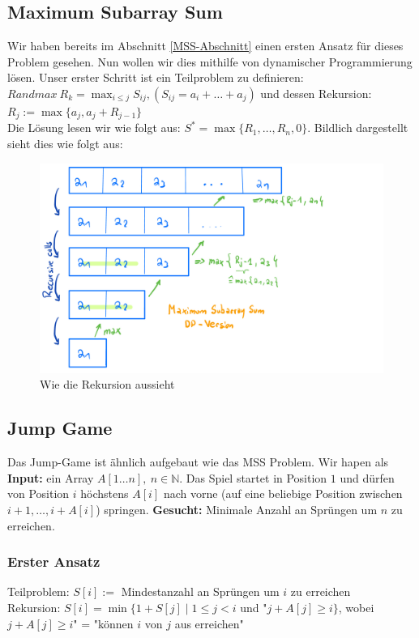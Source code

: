 \documentclass[a4paper]{article}
\begin{document}
\subsection{Maximum Subarray Sum }
Wir haben bereits im Abschnitt \ref{MSS-Abschnitt} einen ersten Ansatz für dieses Problem gesehen. Nun wollen wir dies mithilfe von dynamischer Programmierung lösen.
Unser erster Schritt ist ein Teilproblem zu definieren: \\
$Randmax \ R_k = \max_{i\leq j} S_{ij}, (S_{ij} = a_i + \dots + a_j)$ und dessen Rekursion: $R_j := \max\lbrace a_j,a_j+R_{j-1}\rbrace$ \\
Die Lösung lesen wir wie folgt aus: $S^* = \max\lbrace R_1, \dots, R_n, 0 \rbrace$. Bildlich dargestellt sieht dies wie folgt aus:
\begin{figure}
    \centering
    \includegraphics[width = \textwidth]{Pictures/MSS-DPVersion.jpeg}
    \caption{Wie die Rekursion aussieht}
    \label{fig:MSS-DP}
\end{figure}

\subsection{Jump Game}
Das Jump-Game ist ähnlich aufgebaut wie das MSS Problem. Wir hapen als \textbf{Input:} ein Array $A[1\dots n], \ n \in \mathbb{N}$.
Das Spiel startet in Position $1$ und dürfen von Position $i$ höchstens $A[i]$ nach vorne (auf eine beliebige Position zwischen $i+1, \dots, i+A[i]$) springen. \textbf{Gesucht:} Minimale Anzahl an Sprüngen um $n$ zu erreichen.
\subsubsection*{Erster Ansatz}
Teilproblem: $S[i] :=$ Mindestanzahl an Sprüngen um $i$ zu erreichen\\
Rekursion: $S[i] = \min\lbrace 1 + S[j] \mid 1 \leq j < i $ und "$j+ A[j] \geq i\rbrace$, wobei $j+A[j]\geq i$" =   "können $i$ von $j$ aus erreichen"
\end{document}
